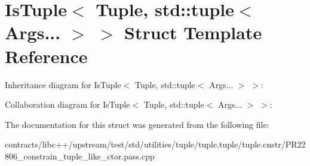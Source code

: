 \hypertarget{struct_is_tuple_3_01_tuple_00_01std_1_1tuple_3_01_args_8_8_8_01_4_01_4}{}\section{Is\+Tuple$<$ Tuple, std\+:\+:tuple$<$ Args... $>$ $>$ Struct Template Reference}
\label{struct_is_tuple_3_01_tuple_00_01std_1_1tuple_3_01_args_8_8_8_01_4_01_4}


Inheritance diagram for Is\+Tuple$<$ Tuple, std\+:\+:tuple$<$ Args... $>$ $>$\+:


Collaboration diagram for Is\+Tuple$<$ Tuple, std\+:\+:tuple$<$ Args... $>$ $>$\+:


The documentation for this struct was generated from the following file\+:\begin{DoxyCompactItemize}
\item 
contracts/libc++/upstream/test/std/utilities/tuple/tuple.\+tuple/tuple.\+cnstr/P\+R22806\+\_\+constrain\+\_\+tuple\+\_\+like\+\_\+ctor.\+pass.\+cpp\end{DoxyCompactItemize}
